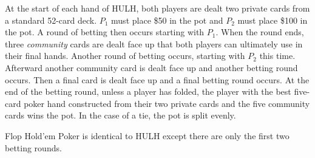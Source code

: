 \documentclass{article}
\begin{document}
At the start of each hand of HULH, both players are dealt two private cards from a standard 52-card deck. $P_1$ must place \$50 in the pot and $P_2$ must place \$100 in the pot. A round of betting then occurs starting with $P_1$. When the round ends, three \emph{community} cards are dealt face up that both players can ultimately use in their final hands. Another round of betting occurs, starting with $P_2$ this time. Afterward another community card is dealt face up and another betting round occurs. Then a final card is dealt face up and a final betting round occurs. At the end of the betting round, unless a player has folded, the player with the best five-card poker hand constructed from their two private cards and the five community cards wins the pot. In the case of a tie, the pot is split evenly.

Flop Hold'em Poker is identical to HULH except there are only the first two betting rounds.


\end{document}
